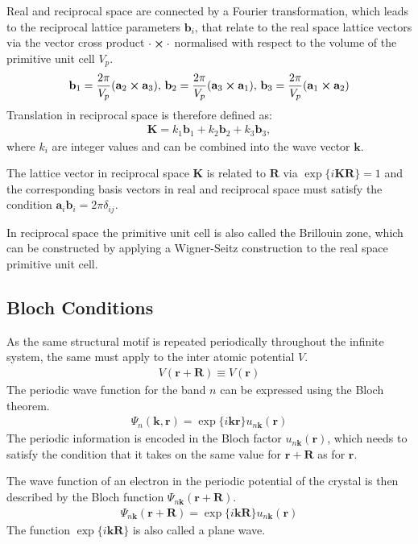 Real and reciprocal space are connected by a Fourier transformation, which leads
to the reciprocal lattice parameters $\mathbf{b}_i$, that relate to the real space
lattice vectors via the vector cross product $\cdot\cross\cdot$ normalised with
respect to the volume of the primitive unit cell $V_p$.
%
\begin{align}
    \mathbf{b}_1=\frac{2\pi}{V_p}(\mathbf{a}_2\cross \mathbf{a}_3),\,\mathbf{b}_2=\frac{2\pi}{V_p}(\mathbf{a}_3\cross \mathbf{a}_1),\,\mathbf{b}_3=\frac{2\pi}{V_p}(\mathbf{a}_1\cross \mathbf{a}_2)
\end{align}
%
Translation in reciprocal space is therefore defined as:
%
\begin{align}
    \mathbf{K}=k_1\mathbf{b}_1+k_2\mathbf{b}_2+k_3\mathbf{b}_3,
\end{align}
%
where $k_i$ are integer values and can be combined into the wave vector $\mathbf{k}$.

The lattice vector in reciprocal space $\mathbf{K}$ is related to $\mathbf{R}$ via
$\exp\{i\mathbf{KR}\}=1$ and the corresponding basis vectors in real and
reciprocal space must satisfy the condition
$\mathbf{a}_i\mathbf{b}_i=2\pi\delta_{ij}$.

In reciprocal space the primitive unit cell is also called the Brillouin zone, which
can be constructed by applying a Wigner-Seitz construction to the real space
primitive unit cell.

\subsection{Bloch Conditions}
\label{sec:BlochConditions}

As the same structural motif is repeated periodically throughout the infinite
system, the same must apply to the inter atomic potential $V$.
%
\begin{align}
    V(\mathbf{r}+\mathbf{R}) \equiv V(\mathbf{r})
\end{align}
%
The periodic wave function for the band $n$ can be expressed using the Bloch theorem.
%
\begin{align}
    \Psi_n(\mathbf{k},\mathbf{r})=\exp\{i\mathbf{k}\mathbf{r}\}u_{n\mathbf{k}}(\mathbf{r})
\end{align}
%
The periodic information is encoded in the Bloch factor
$u_{n\mathbf{k}}(\mathbf{r})$, which needs to satisfy the condition that it
takes on the same value for $\mathbf{r}+\mathbf{R}$ as for $\mathbf{r}$.

The wave function of an electron in the periodic potential of the crystal is
then described by the Bloch function
$\Psi_{n\mathbf{k}}(\mathbf{r}+\mathbf{R})$.
%
\begin{align}
    \Psi_{n\mathbf{k}}(\mathbf{r}+\mathbf{R})=\exp\{i\mathbf{kR}\}u_{n\mathbf{k}}(\mathbf{r})
\end{align}
%
The function $\exp\{i\mathbf{kR}\}$ is also called a plane wave.

